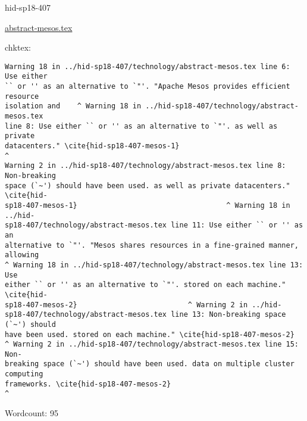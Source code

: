 

\begin{IU}

hid-sp18-407

\href{https://github.com/cloudmesh-community/hid-sp18-407/blob/master//technology/abstract-mesos.tex}{abstract-mesos.tex}

 
chktex:
\begin{tiny}
\begin{verbatim}
Warning 18 in ../hid-sp18-407/technology/abstract-mesos.tex line 6: Use either
`` or '' as an alternative to `"'. "Apache Mesos provides efficient resource
isolation and    ^ Warning 18 in ../hid-sp18-407/technology/abstract-mesos.tex
line 8: Use either `` or '' as an alternative to `"'. as well as private
datacenters." \cite{hid-sp18-407-mesos-1}                                  ^
Warning 2 in ../hid-sp18-407/technology/abstract-mesos.tex line 8: Non-breaking
space (`~') should have been used. as well as private datacenters." \cite{hid-
sp18-407-mesos-1}                                   ^ Warning 18 in ../hid-
sp18-407/technology/abstract-mesos.tex line 11: Use either `` or '' as an
alternative to `"'. "Mesos shares resources in a fine-grained manner, allowing
^ Warning 18 in ../hid-sp18-407/technology/abstract-mesos.tex line 13: Use
either `` or '' as an alternative to `"'. stored on each machine." \cite{hid-
sp18-407-mesos-2}                          ^ Warning 2 in ../hid-
sp18-407/technology/abstract-mesos.tex line 13: Non-breaking space (`~') should
have been used. stored on each machine." \cite{hid-sp18-407-mesos-2}
^ Warning 2 in ../hid-sp18-407/technology/abstract-mesos.tex line 15: Non-
breaking space (`~') should have been used. data on multiple cluster computing
frameworks. \cite{hid-sp18-407-mesos-2}
^
\end{verbatim}
\end{tiny}

Wordcount: 95

\end{IU}




